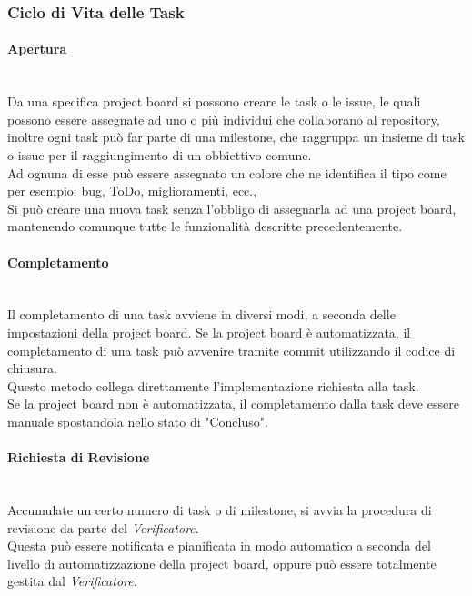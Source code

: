 \subsubsection{Ciclo di Vita delle Task}

\paragraph{Apertura} \-\\
	Da una specifica project board si possono creare le task o le issue\glossario, le quali possono essere assegnate ad uno o più individui che collaborano al repository, inoltre ogni task può far parte di una milestone, che raggruppa un insieme di task o issue per il raggiungimento di un obbiettivo comune. \\
	Ad ognuna di esse può essere assegnato un colore che ne identifica il tipo come per esempio: bug, ToDo, miglioramenti, ecc.,\\
	Si può creare una nuova task senza l'obbligo di assegnarla ad una project board, mantenendo comunque tutte le funzionalità descritte precedentemente. 

\paragraph{Completamento} \-\\\label{ProcessiOrganizzativi_GestioneProgetto_CicloTask_Completamento}
	Il completamento di una task avviene in diversi modi, a seconda delle impostazioni della project board. 
	Se la project board è automatizzata, il completamento di una task può avvenire tramite commit utilizzando il codice di chiusura. \\
	Questo metodo collega direttamente l'implementazione richiesta alla task. \\
	Se la project board non è automatizzata, il completamento dalla task deve essere manuale spostandola nello stato di "Concluso". 
	
\paragraph{Richiesta di Revisione} \-\\
	Accumulate un certo numero di task o di milestone, si avvia la procedura di revisione da parte del \textit{Verificatore}. \\ Questa può essere notificata e pianificata in modo automatico a seconda del livello di automatizzazione della project board, oppure può essere totalmente gestita dal \textit{Verificatore}. 
	
